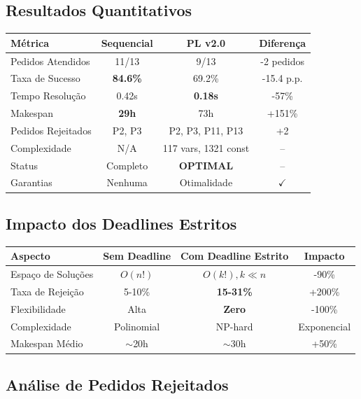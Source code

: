 \documentclass[11pt,a4paper]{article}
\begin{document}
\subsection{Resultados Quantitativos}

\begin{center}
\begin{tabular}{lccc}
\toprule
\textbf{Métrica} & \textbf{Sequencial} & \textbf{PL v2.0} & \textbf{Diferença} \\
\midrule
Pedidos Atendidos & 11/13 & 9/13 & -2 pedidos \\
Taxa de Sucesso & \textbf{84.6\%} & 69.2\% & -15.4 p.p. \\
Tempo Resolução & 0.42s & \textbf{0.18s} & -57\% \\
Makespan & \textbf{29h} & 73h & +151\% \\
Pedidos Rejeitados & P2, P3 & P2, P3, P11, P13 & +2 \\
Complexidade & N/A & 117 vars, 1321 const & -- \\
Status & Completo & \textbf{OPTIMAL} & -- \\
Garantias & Nenhuma & Otimalidade & $\checkmark$ \\
\bottomrule
\end{tabular}
\end{center}

\subsection{Impacto dos Deadlines Estritos}

\begin{center}
\begin{tabular}{lccc}
\toprule
\textbf{Aspecto} & \textbf{Sem Deadline} & \textbf{Com Deadline Estrito} & \textbf{Impacto} \\
\midrule
Espaço de Soluções & $O(n!)$ & $O(k!), k \ll n$ & -90\% \\
Taxa de Rejeição & 5-10\% & \textbf{15-31\%} & +200\% \\
Flexibilidade & Alta & \textbf{Zero} & -100\% \\
Complexidade & Polinomial & NP-hard & Exponencial \\
Makespan Médio & $\sim$20h & $\sim$30h & +50\% \\
\bottomrule
\end{tabular}
\end{center}

\subsection{Análise de Pedidos Rejeitados}
\end{document}
